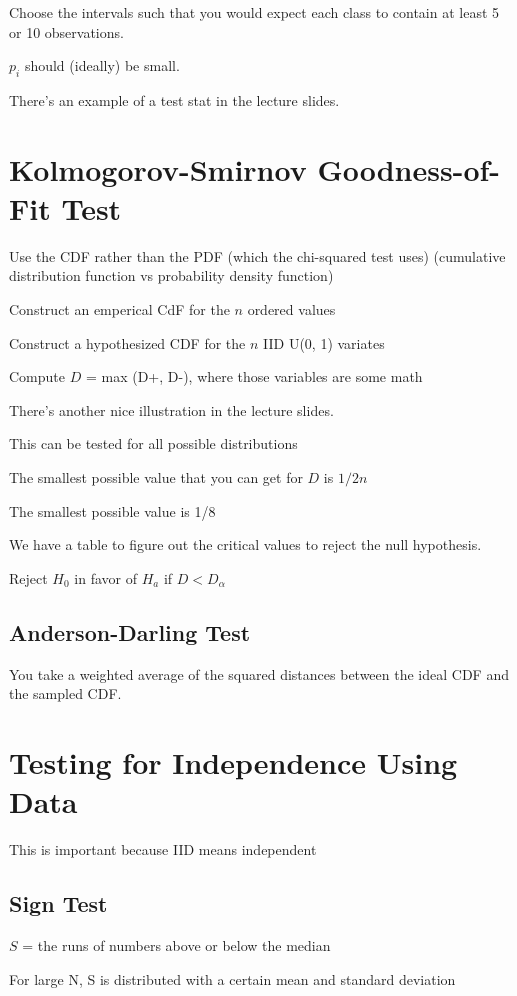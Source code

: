 \documentclass[fleqn]{report}
\begin{document}
Choose the intervals such that you would expect 
each class to contain at least 5 or 10 observations. 

$p_i$ should (ideally) be small. 

There's an example of a test stat in the lecture slides. 

\section{Kolmogorov-Smirnov Goodness-of-Fit Test}
Use the CDF rather than the PDF (which the chi-squared test uses) 
(cumulative distribution function vs probability density function)

Construct an emperical CdF for the $n$ ordered values 

Construct a hypothesized CDF for the $n$ IID U(0, 1) variates 

Compute $D$ = max (D+, D-), where those variables are some math 

There's another nice illustration in the lecture slides. 

This can be tested for all possible distributions 

The smallest possible value that you can get for $D$ is $1/2n$ 

The smallest possible value is 1/8

We have a table to figure out the critical values to reject the null hypothesis. 

Reject $H_0$ in favor of $H_a$ if $D < D_{\alpha}$ 

\subsection{Anderson-Darling Test}
You take a weighted average of the squared distances between the ideal CDF 
and the sampled CDF. 

\section{Testing for Independence Using Data}
This is important because IID means independent 

\subsection{Sign Test}
$S$ = the runs of numbers above or below the median 

For large N, S is distributed with a certain mean and standard deviation 
\end{document}
